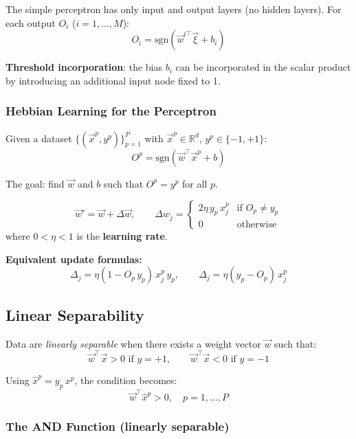 \documentclass[11pt,a4paper]{article}
\newcommand{\R}{\mathbb{R}}
\newcommand{\vx}{\vec{x}}
\newcommand{\sgn}{\text{sgn}}
\begin{document}
The simple perceptron has only input and output layers (no hidden layers). For each output $O_i$ ($i=1,\ldots,M$):
\[
O_i = \sgn(\vec{w}^{i\top} \vec{\xi} + b_i)
\]

\textbf{Threshold incorporation}: the bias $b_i$ can be incorporated in the scalar product by introducing an additional input node fixed to 1.

\subsubsection{Hebbian Learning for the Perceptron}

Given a dataset $\{(\vx^p, y^p)\}_{p=1}^{P}$ with $\vx^p\in\R^d$, $y^p\in\{-1,+1\}$:
\[
O^p = \sgn(\vec{w}^\top \vec{x}^p + b)
\]

The goal: find $\vec{w}$ and $b$ such that $O^p = y^p$ for all $p$.

\begin{keybox}[title=Update Rule]
\[
\vec{w}' = \vec{w} + \Delta\vec{w}, \qquad
\Delta w_j = \begin{cases}
2\eta\, y_p\, x_j^p & \text{if } O_p \neq y_p\\
0 & \text{otherwise}
\end{cases}
\]
where $0 < \eta < 1$ is the \textbf{learning rate}.
\end{keybox}

\textbf{Equivalent update formulas:}
\[
\Delta_j = \eta(1 - O_p\, y_p)\, x_j^p\, y_p, \qquad
\Delta_j = \eta(y_p - O_p)\, x_j^p
\]

\subsection{Linear Separability}

\begin{definitionbox}[title=Linear Separability]
Data are \emph{linearly separable} when there exists a weight vector $\vec{w}$ such that:
\[
\vec{w}^\top \vx > 0 \text{ if } y = +1, \qquad \vec{w}^\top \vx < 0 \text{ if } y = -1
\]
\end{definitionbox}

Using $\hat{x}^p = y_p\, x^p$, the condition becomes:
\[
\vec{w}^\top \hat{x}^p > 0, \quad p = 1,\ldots,P
\]

\subsubsection{The AND Function (linearly separable)}
\end{document}
